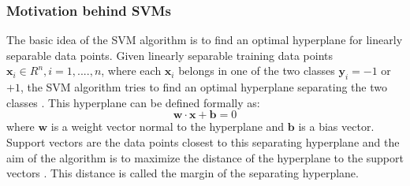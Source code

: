 \documentclass[a4paper,11pt,oneside]{article}
\begin{document}
\subsubsection*{Motivation behind SVMs}
The basic idea of the SVM algorithm is to find an optimal hyperplane for linearly separable data points.
Given linearly separable training data points $\mathbf{x}_i\in R^n,i=1,....,n$, where each $\mathbf{x}_i$
belongs in one of the two classes $\mathbf{y}_i=-1$ or $+1$, the SVM algorithm tries to find an optimal hyperplane
separating the two classes \cite{fletcher2009support}. This hyperplane can be defined formally as:
\begin{equation}
  \mathbf{w}\cdot\mathbf{x} + \mathbf{b} = 0
\end{equation} where $\mathbf{w}$ is a weight vector normal to the hyperplane and $\mathbf{b}$ is a bias vector.
Support vectors are the data points closest to this separating
hyperplane and the aim of the algorithm is to maximize the distance of the hyperplane to the support
vectors \cite{law2006simple}. This distance is called the margin of the separating hyperplane.
\end{document}
